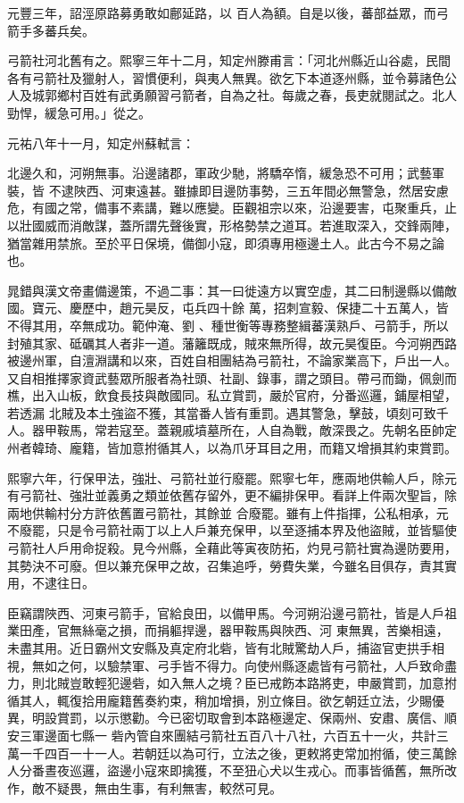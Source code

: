 \begin{pinyinscope}
 元豐三年，詔涇原路募勇敢如鄜延路，以
 百人為額。自是以後，蕃部益眾，而弓箭手多蕃兵矣。



 弓箭社河北舊有之。熙寧三年十二月，知定州滕甫言：「河北州縣近山谷處，民間各有弓箭社及獵射人，習慣便利，與夷人無異。欲乞下本道逐州縣，並令募諸色公人及城郭鄉村百姓有武勇願習弓箭者，自為之社。每歲之春，長吏就閱試之。北人勁悍，緩急可用。」從之。



 元祐八年十一月，知定州蘇軾言：



 北邊久和，河朔無事。沿邊諸郡，軍政少馳，將驕卒惰，緩急恐不可用；武藝軍裝，皆
 不逮陜西、河東遠甚。雖據即目邊防事勢，三五年間必無警急，然居安慮危，有國之常，備事不素講，難以應變。臣觀祖宗以來，沿邊要害，屯聚重兵，止以壯國威而消敵謀，蓋所謂先聲後實，形格勢禁之道耳。若進取深入，交鋒兩陣，猶當雜用禁旅。至於平日保境，備御小寇，即須專用極邊土人。此古今不易之論也。


晁錯與漢文帝畫備邊策，不過二事：其一曰徙遠方以實空虛，其二曰制邊縣以備敵國。寶元、慶歷中，趙元昊反，屯兵四十餘
 萬，招刺宣毅、保捷二十五萬人，皆不得其用，卒無成功。範仲淹、劉
 、種世衡等專務整緝蕃漢熟戶、弓箭手，所以封殖其家、砥礪其人者非一道。藩籬既成，賊來無所得，故元昊復臣。今河朔西路被邊州軍，自澶淵講和以來，百姓自相團結為弓箭社，不論家業高下，戶出一人。又自相推擇家資武藝眾所服者為社頭、社副、錄事，謂之頭目。帶弓而鋤，佩劍而樵，出入山板，飲食長技與敵國同。私立賞罰，嚴於官府，分番巡邏，鋪屋相望，若透漏
 北賊及本土強盜不獲，其當番人皆有重罰。遇其警急，擊鼓，頃刻可致千人。器甲鞍馬，常若寇至。蓋親戚墳墓所在，人自為戰，敵深畏之。先朝名臣帥定州者韓琦、龐籍，皆加意拊循其人，以為爪牙耳目之用，而籍又增損其約束賞罰。



 熙寧六年，行保甲法，強壯、弓箭社並行廢罷。熙寧七年，應兩地供輸人戶，除元有弓箭社、強壯並義勇之類並依舊存留外，更不編排保甲。看詳上件兩次聖旨，除兩地供輸村分方許依舊置弓箭社，其餘並
 合廢罷。雖有上件指揮，公私相承，元不廢罷，只是令弓箭社兩丁以上人戶兼充保甲，以至逐捕本界及他盜賊，並皆驅使弓箭社人戶用命捉殺。見今州縣，全藉此等寅夜防拓，灼見弓箭社實為邊防要用，其勢決不可廢。但以兼充保甲之故，召集追呼，勞費失業，今雖名目俱存，責其實用，不逮往日。



 臣竊謂陜西、河東弓箭手，官給良田，以備甲馬。今河朔沿邊弓箭社，皆是人戶祖業田產，官無絲毫之損，而捐軀捍邊，器甲鞍馬與陜西、河
 東無異，苦樂相遠，未盡其用。近日霸州文安縣及真定府北砦，皆有北賊驚劫人戶，捕盜官吏拱手相視，無如之何，以驗禁軍、弓手皆不得力。向使州縣逐處皆有弓箭社，人戶致命盡力，則北賊豈敢輕犯邊砦，如入無人之境？臣已戒飭本路將吏，申嚴賞罰，加意拊循其人，輒復拾用龐籍舊奏約束，稍加增損，別立條目。欲乞朝廷立法，少賜優異，明設賞罰，以示懲勸。今已密切取會到本路極邊定、保兩州、安肅、廣信、順安三軍邊面七縣一
 砦內管自來團結弓箭社五百八十八社，六百五十一火，共計三萬一千四百一十一人。若朝廷以為可行，立法之後，更敕將吏常加拊循，使三萬餘人分番晝夜巡邏，盜邊小寇來即擒獲，不至狃心犬以生戎心。而事皆循舊，無所改作，敵不疑畏，無由生事，有利無害，較然可見。




\end{pinyinscope}
